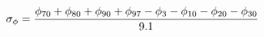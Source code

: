 \documentclass[10pt]{article}
\begin{document}
\begin{align*}\sigma_\phi={ \phi_{70} + \phi_{80} + \phi_{90}  + \phi_{97}  - \phi_{3} - \phi_{10} - \phi_{20} - \phi_{30}   \over 9.1 }\end{align*}
\end{document}
